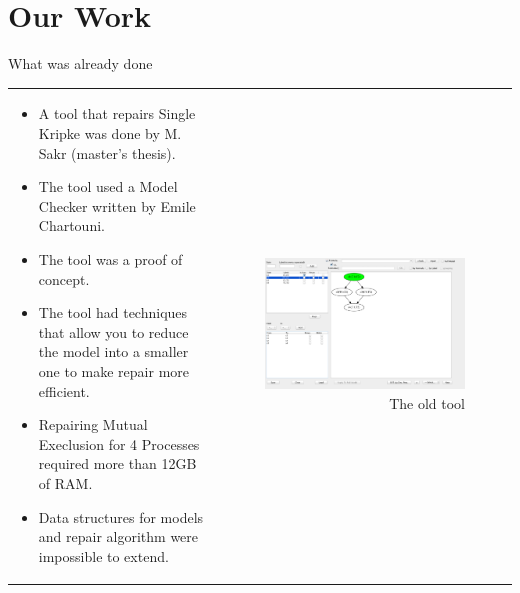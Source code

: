 \documentclass{bredelebeamer}
\begin{document}
\section{Our Work} %
\begin{frame}{What was already done}
\begin{tabular}{l r}
\begin{minipage}{0.5\textwidth}
\begin{itemize}
\item A tool that repairs Single Kripke was done by M. Sakr (master's thesis).
\item The tool used a Model Checker written by Emile Chartouni.
\item The tool was a proof of concept.
\item The tool had techniques that allow you to reduce the model into a smaller one to make repair more efficient.
\item Repairing Mutual Execlusion for 4 Processes required more than 12GB of RAM.
\item Data structures for models and repair algorithm were impossible to extend.
\end{itemize}
\end{minipage}
&
\begin{minipage}{0.5\textwidth}
\begin{figure}
\centering
\includegraphics[scale=0.13]{old.png}
\caption{The old tool}
\end{figure}
\end{minipage}
\end{tabular}
\end{frame}
\end{document}
